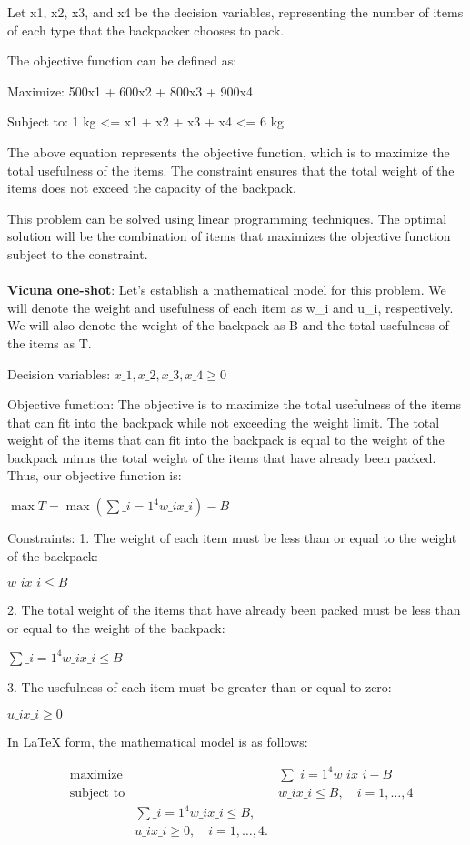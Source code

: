 \documentclass{article}%
\begin{document}
Let x1, x2, x3, and x4 be the decision variables, representing the number of items of each type that the backpacker chooses to pack.

The objective function can be defined as:

Maximize: 500x1 + 600x2 + 800x3 + 900x4

Subject to: 1 kg <= x1 + x2 + x3 + x4 <= 6 kg

The above equation represents the objective function, which is to maximize the total usefulness of the items. The constraint ensures that the total weight of the items does not exceed the capacity of the backpack.

This problem can be solved using linear programming techniques. The optimal solution will be the combination of items that maximizes the objective function subject to the constraint.\\\\%
\textbf{Vicuna one-shot}: Let's establish a mathematical model for this problem. We will denote the weight and usefulness of each item as w\_i and u\_i, respectively. We will also denote the weight of the backpack as B and the total usefulness of the items as T.

Decision variables:
$x\_1, x\_2, x\_3, x\_4 \geq 0$

Objective function:
The objective is to maximize the total usefulness of the items that can fit into the backpack while not exceeding the weight limit. The total weight of the items that can fit into the backpack is equal to the weight of the backpack minus the total weight of the items that have already been packed. Thus, our objective function is:

$\max T = \max \left( \sum\_{i=1}^4 w\_i x\_i \right) - B$

Constraints:
1. The weight of each item must be less than or equal to the weight of the backpack:

$w\_i x\_i \leq B$

2. The total weight of the items that have already been packed must be less than or equal to the weight of the backpack:

$\sum\_{i=1}^4 w\_i x\_i \leq B$

3. The usefulness of each item must be greater than or equal to zero:

$u\_i x\_i \geq 0$

In LaTeX form, the mathematical model is as follows:

\[
\begin{aligned}
& \text{maximize} && \sum\_{i=1}^4 w\_i x\_i - B \\
& \text{subject to} && w\_i x\_i \leq B, \quad i=1,\ldots,4 \\
&& \sum\_{i=1}^4 w\_i x\_i \leq B, \\
&& u\_i x\_i \geq 0, \quad i=1,\ldots,4.
\end{aligned}
\]
\end{document}
